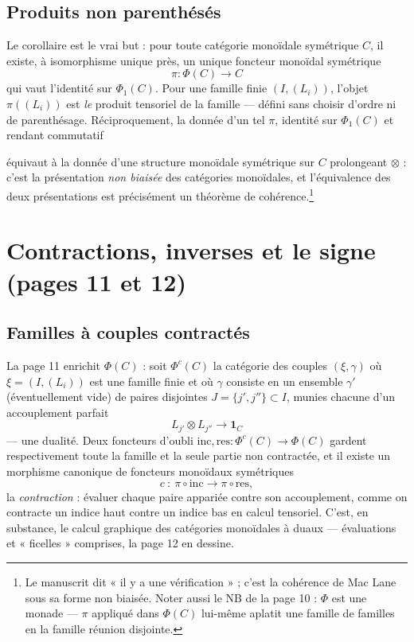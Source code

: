 \documentclass[11pt,a4paper]{article}
\begin{document}
\subsection*{Produits non parenthésés}

Le corollaire est le vrai but : pour toute catégorie monoïdale symétrique
$C$, il existe, à isomorphisme unique près, un unique foncteur monoïdal
symétrique
\[
\pi : \Phi(C) \longrightarrow C
\]
qui vaut l'identité sur $\Phi_1(C)$. Pour une famille finie
$(I, (L_i))$, l'objet $\pi((L_i))$ est \emph{le} produit tensoriel de la
famille — défini sans choisir d'ordre ni de parenthésage. Réciproquement,
la donnée d'un tel $\pi$, identité sur $\Phi_1(C)$ et rendant commutatif


équivaut à la donnée d'une structure monoïdale symétrique sur $C$
prolongeant $\otimes$ : c'est la présentation \emph{non biaisée} des
catégories monoïdales, et l'équivalence des deux présentations est
précisément un théorème de cohérence.\footnote{Le manuscrit dit « il y a
une vérification » ; c'est la cohérence de Mac Lane sous sa forme non
biaisée. Noter aussi le NB de la page 10 : $\Phi$ est une monade —
$\pi$ appliqué dans $\Phi(C)$ lui-même aplatit une famille de familles en
la famille réunion disjointe.}

\section*{Contractions, inverses et le signe (pages 11 et 12)}

\subsection*{Familles à couples contractés}

La page 11 enrichit $\Phi(C)$ : soit $\Phi^{c}(C)$ la catégorie des
couples $(\xi, \gamma)$ où $\xi = (I, (L_i))$ est une famille finie et où
$\gamma$ consiste en un ensemble $\gamma'$ (éventuellement vide) de paires
disjointes $J = \{j', j''\} \subset I$, munies chacune d'un accouplement
parfait
\[
L_{j'} \otimes L_{j''} \longrightarrow \mathbf{1}_C
\]
— une dualité. Deux foncteurs d'oubli
$\mathrm{inc}, \mathrm{res} : \Phi^{c}(C) \to \Phi(C)$ gardent
respectivement toute la famille et la seule partie non contractée, et il
existe un morphisme canonique de foncteurs monoïdaux symétriques
\[
c\ :\ \pi \circ \mathrm{inc} \longrightarrow \pi \circ \mathrm{res},
\]
la \emph{contraction} : évaluer chaque paire appariée contre son
accouplement, comme on contracte un indice haut contre un indice bas en
calcul tensoriel. C'est, en substance, le calcul graphique des catégories
monoïdales à duaux — évaluations et « ficelles » comprises, la page 12
en dessine.
\end{document}
